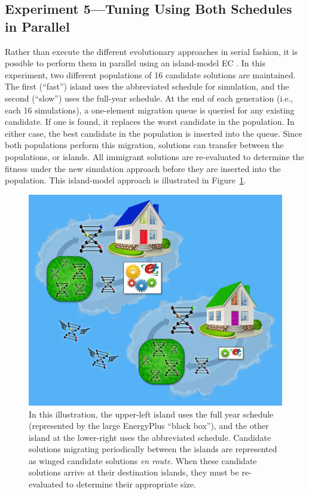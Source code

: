 \documentclass[preprint, review, 12pt]{elsarticle}
\begin{document}
\subsection{Experiment 5---Tuning Using Both Schedules in Parallel}
\label{sub:experiment5}
Rather than execute the different evolutionary approaches in serial fashion, it is possible to perform them in parallel using an island-model EC \cite{cit:eiben2007}. In this experiment, two different populations of 16 candidate solutions are maintained. The first (``fast'') island uses the abbreviated schedule for simulation, and the second (``slow'') uses the full-year schedule. At the end of each generation (i.e., each 16 simulations), a one-element migration queue is queried for any existing candidate. If one is found, it replaces the worst candidate in the population. In either case, the best candidate in the population is inserted into the queue. Since both populations perform this migration, solutions can transfer between the populations, or islands. All immigrant solutions are re-evaluated to determine the fitness under the new simulation approach before they are inserted into the population. This island-model approach is illustrated in Figure~\ref{fig:islands}.

\begin{figure}[htbp]
\centering
\includegraphics[width=5in]{graphics/autotune_islands}
\caption{In this illustration, the upper-left island uses the full year schedule (represented by the large EnergyPlus ``black box''), and the other island at the lower-right uses the abbreviated schedule. Candidate solutions migrating periodically between the islands are represented as winged candidate solutions \emph{en route}. When these candidate solutions arrive at their destination islands, they must be re-evaluated to determine their appropriate size.}
\label{fig:islands}
\end{figure}
\end{document}
